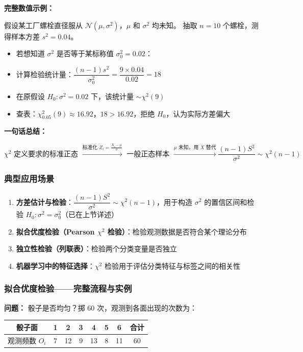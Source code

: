\medskip
\textbf{完整数值示例：}

假设某工厂螺栓直径服从 $\mathcal{N}(\mu, \sigma^2)$，$\mu$ 和 $\sigma^2$ 均未知。
抽取 $n = 10$ 个螺栓，测得样本方差 $s^2 = 0.04$。

\begin{itemize}
    \item 若想知道 $\sigma^2$ 是否等于某标称值 $\sigma_0^2 = 0.02$：
    \item 计算检验统计量：$\dfrac{(n-1)s^2}{\sigma_0^2} = \dfrac{9 \times 0.04}{0.02} = 18$
    \item 在原假设 $H_0: \sigma^2 = 0.02$ 下，该统计量 $\sim \chi^2(9)$
    \item 查表：$\chi^2_{0.05}(9) \approx 16.92$，$18 > 16.92$，拒绝 $H_0$，认为实际方差偏大
\end{itemize}

\medskip
\textbf{一句话总结：}

\[
\text{$\chi^2$ 定义要求的标准正态 } \xrightarrow{\text{标准化 } Z_i = \frac{X_i - \mu}{\sigma}}
\text{ 一般正态样本 } \xrightarrow{\text{$\mu$ 未知，用 $\bar{X}$ 替代}}
\frac{(n-1)S^2}{\sigma^2} \sim \chi^2(n-1)
\]

\subsubsection{典型应用场景}

\begin{enumerate}[label=(\arabic*)]
    \item \textbf{方差估计与检验}：$\dfrac{(n-1)S^2}{\sigma^2} \sim \chi^2(n-1)$，用于构造 $\sigma^2$ 的置信区间和检验 $H_0: \sigma^2 = \sigma_0^2$（已在上节详述）
    \item \textbf{拟合优度检验（Pearson $\chi^2$ 检验）}：检验观测数据是否符合某个理论分布
    \item \textbf{独立性检验（列联表）}：检验两个分类变量是否独立
    \item \textbf{机器学习中的特征选择}：$\chi^2$ 检验用于评估分类特征与标签之间的相关性
\end{enumerate}

\subsubsection{拟合优度检验——完整流程与实例}

\textbf{问题：} 骰子是否均匀？掷 60 次，观测到各面出现的次数为：

\begin{center}
\begin{tabular}{c|cccccc|c}
\toprule
骰子面 & 1 & 2 & 3 & 4 & 5 & 6 & 合计 \\
\midrule
观测频数 $O_i$ & 7 & 12 & 9 & 13 & 8 & 11 & 60 \\
\bottomrule
\end{tabular}
\end{center}

